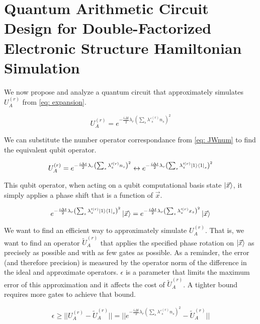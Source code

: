 

\chapter{Quantum Arithmetic Circuit Design for Double-Factorized Electronic Structure Hamiltonian Simulation}

We now propose and analyze a quantum circuit that approximately simulates $U_A^{(r)}$ from \eqref{eq: expansion}.

\begin{equation}
    U_A^{(r)} = e^{-\frac{i\Delta t}{2}\lambda_r\left(\sum_s \lambda'^{(r)}_s n_s\right)^2} \label{eq: U_A}
\end{equation}

We can substitute the number operator correspondance from \eqref{eq: JWnum} to find the equivalent qubit operator.

\begin{equation}
    U_A^{(r)} = e^{-\frac{i\Delta t}{2}\lambda_r\left(\sum_s \lambda'^{(r)}_s n_s\right)^2} \leftrightarrow e^{-\frac{i\Delta t}{2}\lambda_r\left(\sum_s \lambda'^{(r)}_s \ket{1}\bra{1}_s\right)^2}
\end{equation}

This qubit operator, when acting on a qubit computational basis state $\ket{\vec{x}}$, it simply applies a phase shift that is a function of $\vec{x}$.

\begin{equation}
    e^{-\frac{i\Delta t}{2}\lambda_r\left(\sum_s \lambda'^{(r)}_s \ket{1}\bra{1}_s\right)^2}\ket{\vec{x}} = e^{-\frac{i\Delta t}{2}\lambda_r\left(\sum_s \lambda'^{(r)}_s x_s\right)^2}\ket{\vec{x}}
\end{equation}

We want to find an efficient way to approximately simulate $U_A^{(r)}$. That is, we want to find an operator $\tilde{U}_A^{(r)}$ that applies the specified phase rotation on $\ket{\vec{x}}$ as precisely as possible and with as few gates as possible. As a reminder, the error (and therefore precision) is measured by the operator norm of the difference in the ideal and approximate operators. $\epsilon$ is a parameter that limits the maximum error of this approximation and it affects the cost of $\tilde{U}_A^{(r)}$. A tighter bound requires more gates to achieve that bound.

\begin{equation}
    \epsilon \geq ||U_A^{(r)} - \tilde{U}_A^{(r)}|| = ||e^{-\frac{i\Delta t}{2}\lambda_r\left(\sum_s \lambda'^{(r)}_s n_s\right)^2} - \tilde{U}_A^{(r)}|| \label{eq: error}
\end{equation}

